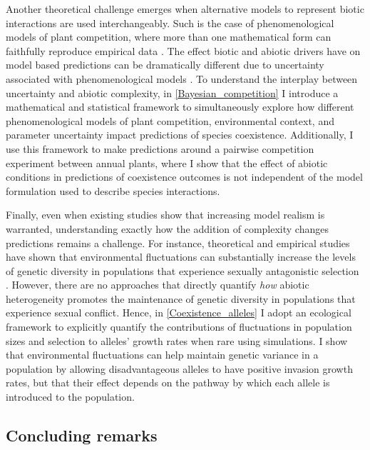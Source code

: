 \begin{refsection}
Another theoretical challenge emerges when alternative models to represent biotic interactions are used interchangeably. Such is the case of phenomenological models of plant competition, where more than one mathematical form can faithfully reproduce empirical data \citep{levine2009importance,godoy_phenology_2014,godoy_phylogenetic_2014,mayfield2017higher,bimler_accurate_2018}. The effect biotic and abiotic drivers have on model based predictions can be dramatically different due to uncertainty associated with phenomenological models \citep{jorgensen2001fundamentals,flora_structural_2011, aldebert2018community}. To understand the interplay between uncertainty and abiotic complexity, in \autoref{Bayesian_competition} I introduce a mathematical and statistical framework to simultaneously explore how different phenomenological models of plant competition, environmental context, and parameter uncertainty impact predictions of species coexistence. Additionally, I use this framework to make predictions around a pairwise competition experiment between annual plants, where I show that the effect of abiotic conditions in predictions of coexistence outcomes is not independent of the model formulation used to describe species interactions.

Finally, even when existing studies show that increasing model realism is warranted, understanding exactly how the addition of complexity changes predictions remains a challenge. For instance, theoretical and empirical studies have shown that environmental fluctuations can substantially increase the levels of genetic diversity in populations that experience sexually antagonistic selection \citep{connallon2012general,connallon_evolutionary_2019, glaser2021sexual}. However, there are no approaches that directly quantify \textit{how} abiotic heterogeneity promotes the maintenance of genetic diversity in populations that experience sexual conflict. Hence, in \autoref{Coexistence_alleles} I adopt an ecological framework to explicitly quantify the contributions of fluctuations in population sizes and selection to alleles' growth rates when rare using simulations. I show that environmental fluctuations can help maintain genetic variance in a population by allowing disadvantageous alleles to have positive invasion growth rates,  but that their effect depends on the pathway by which each allele is introduced to the population.


\subsection*{Concluding remarks}


\end{refsection}
